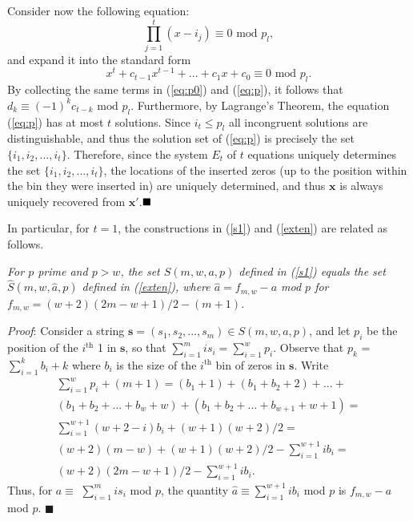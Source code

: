 {Consider now the following equation:
\begin{equation}\label{eq:p0} \prod_{j=1}^t(x-i_j)\equiv 0 \text{ mod } p_l,
\end{equation}
and expand it into the standard form
\begin{equation}\label{eq:p}
x^t+c_{t-1}x^{t-1}+...+c_1x+c_0 \equiv 0 \text{ mod } p_l.
\end{equation}
By collecting the same terms in (\ref{eq:p0}) and (\ref{eq:p}), it
follows that $d_k \equiv (-1)^kc_{t-k} \text{ mod } p_l$.
Furthermore, by Lagrange's Theorem, the equation (\ref{eq:p}) has
at most $t$ solutions. Since $i_t \leq p_l$ all incongruent
solutions are distinguishable, and thus the solution set of
(\ref{eq:p}) is precisely the set $\{i_1,i_2,...,i_t\}$.
Therefore, since the system $E_t$ of $t$ equations uniquely
determines the set $\{i_1,i_2,...,i_t\}$, the locations of the
inserted zeros (up to the position within the bin they were
inserted in) are uniquely determined, and thus $\mathbf{x}$ is
always uniquely recovered from $\mathbf{x'}$.$\hfill\blacksquare$
}

In particular, for $t=1$, the constructions in (\ref{s1}) and
(\ref{exten}) are related as follows.

\begin{lemma}\textit{For $p$ prime and $p > w$, the set $S(m,w,a,p)$
defined in (\ref{s1}) equals the set $\hat{S}(m,w,\hat{a},p)$
defined in (\ref{exten}), where $\hat{a}=f_{m,w}-{a}$ mod $p$ for
$f_{m,w}=(w+2)(2m-w+1)/2-(m+1)$.}\end{lemma} \textit{Proof}:
Consider a string $\mathbf{s} =(s_1,s_2,...,s_m)\in S(m,w,a,p)$,
and let $p_i$ be the position of the $i^{\text{th}}$ 1 in
$\mathbf{s}$, so that $\sum_{i=1}^m is_i =\sum_{i=1}^w p_i$.
Observe that $p_k$ = $\sum_{i=1}^k b_i+k$ where $b_i$ is the size
of the $i^{\text{th}}$ bin of zeros in $\mathbf{s}$. Write
\begin{equation}\begin{array}{lll}
\sum_{i=1}^wp_i+(m+1)=
(b_1+1)+(b_1+b_2+2)+...+\\
(b_1+b_2+...+b_w+w)+(b_1+b_2+...+b_{w+1}+w+1)=\\
\sum_{i=1}^{w+1}(w+2-i)b_i+(w+1)(w+2)/2=\\
(w+2)(m-w)+(w+1)(w+2)/2-\sum_{i=1}^{w+1}ib_i=\\
(w+2)(2m-w+1)/2-\sum_{i=1}^{w+1}ib_i.
\end{array}\end{equation}
Thus, for $a \equiv$ $\sum_{i=1}^m is_i$ mod $p$, the quantity
$\hat{a} \equiv \sum_{i=1}^{w+1}ib_i$ mod $p$ is $ f_{m,w}-a$ mod
$p$. \hfill$\blacksquare$


